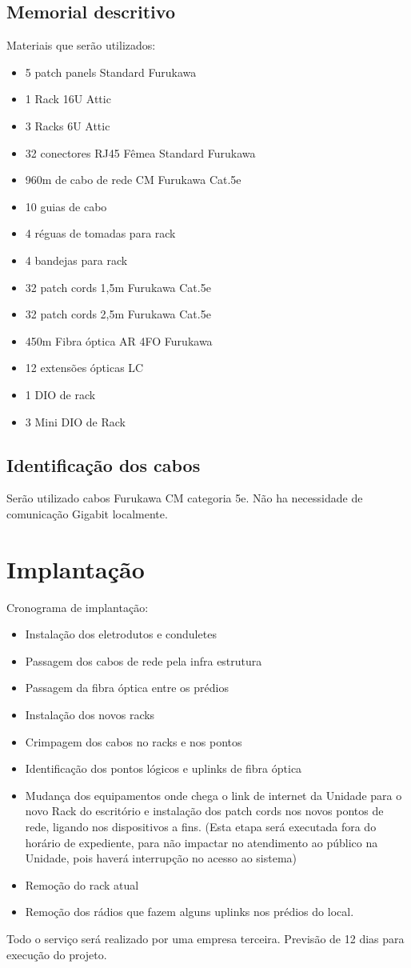 \documentclass[	DIV=calc,%
							paper=a4,%
							fontsize=12pt,%
							onecolumn]{scrartcl}	 					%
\begin{document}
\subsection{Memorial descritivo}
Materiais que serão utilizados:
\begin{itemize}
	\item 5 patch panels Standard Furukawa
	\item 1 Rack 16U Attic
	\item 3 Racks 6U Attic
	\item 32 conectores RJ45 Fêmea Standard Furukawa
	\item 960m de cabo de rede CM Furukawa Cat.5e
	\item 10 guias de cabo
	\item 4 réguas de tomadas para rack
	\item 4 bandejas para rack
	\item 32 patch cords 1,5m Furukawa Cat.5e
	\item 32 patch cords 2,5m Furukawa Cat.5e
	\item 450m Fibra óptica AR 4FO Furukawa
	\item 12 extensões ópticas LC
	\item 1 DIO de rack
	\item 3 Mini DIO de Rack
\end{itemize}

\subsection{Identificação dos cabos}
Serão utilizado cabos Furukawa CM categoria 5e. Não ha necessidade de comunicação Gigabit localmente.

\section{Implantação}

Cronograma de implantação:
\begin{itemize}
	\item Instalação dos eletrodutos e conduletes
	\item Passagem dos cabos de rede pela infra estrutura
	\item Passagem da fibra óptica entre os prédios
	\item Instalação dos novos racks
	\item Crimpagem dos cabos no racks e nos pontos
	\item Identificação dos pontos lógicos e uplinks de fibra óptica
	\item Mudança dos equipamentos onde chega o link de internet da Unidade para o novo Rack do escritório e instalação dos patch cords nos novos pontos de rede, ligando nos dispositivos a fins. (Esta etapa será executada fora do horário de expediente, para não impactar no atendimento ao público na Unidade, pois haverá interrupção no acesso ao sistema)
	\item Remoção do rack atual
	\item Remoção dos rádios que fazem alguns uplinks nos prédios do local.
\end{itemize}
Todo o serviço será realizado por uma empresa terceira. Previsão de 12 dias para execução do projeto.
\end{document}

